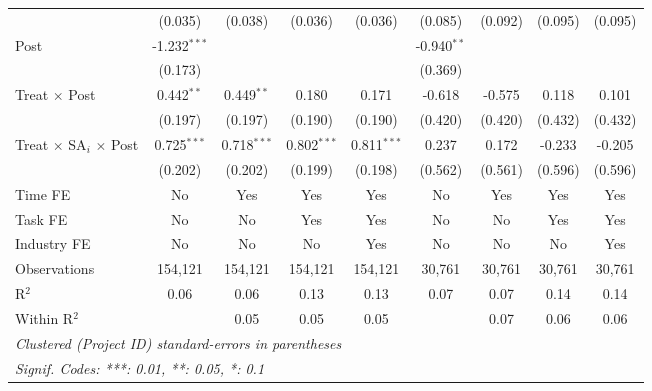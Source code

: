 \documentclass[
]{article}
\begin{document}
\begin{tabular}{lcccccccc}
                                         & (0.035)        & (0.038)        & (0.036)        & (0.036)        & (0.085)        & (0.092)       & (0.095)       & (0.095)\\   
   Post                                  & -1.232$^{***}$ &                &                &                & -0.940$^{**}$  &               &               &   \\   
                                         & (0.173)        &                &                &                & (0.369)        &               &               &   \\   
   Treat $\times$ Post                   & 0.442$^{**}$   & 0.449$^{**}$   & 0.180          & 0.171          & -0.618         & -0.575        & 0.118         & 0.101\\   
                                         & (0.197)        & (0.197)        & (0.190)        & (0.190)        & (0.420)        & (0.420)       & (0.432)       & (0.432)\\   
   Treat $\times$ SA$_i$ $\times$ Post   & 0.725$^{***}$  & 0.718$^{***}$  & 0.802$^{***}$  & 0.811$^{***}$  & 0.237          & 0.172         & -0.233        & -0.205\\   
                                         & (0.202)        & (0.202)        & (0.199)        & (0.198)        & (0.562)        & (0.561)       & (0.596)       & (0.596)\\   
   Time FE                               & No             & Yes            & Yes            & Yes            & No             & Yes           & Yes           & Yes\\  
   Task FE                               & No             & No             & Yes            & Yes            & No             & No            & Yes           & Yes\\  
   Industry FE                           & No             & No             & No             & Yes            & No             & No            & No            & Yes\\  
   Observations                          & 154,121        & 154,121        & 154,121        & 154,121        & 30,761         & 30,761        & 30,761        & 30,761\\  
   R$^2$                                 & 0.06           & 0.06           & 0.13           & 0.13           & 0.07           & 0.07          & 0.14          & 0.14\\  
   Within R$^2$                          &                & 0.05           & 0.05           & 0.05           &                & 0.07          & 0.06          & 0.06\\  
   \midrule
   \multicolumn{9}{l}{\emph{Clustered (Project ID) standard-errors in parentheses}}\\
   \multicolumn{9}{l}{\emph{Signif. Codes: ***: 0.01, **: 0.05, *: 0.1}}\\
\end{tabular}
\par\endgroup
\end{document}
